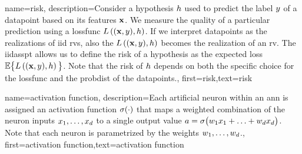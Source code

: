 {name={risk},
	description={Consider a \gls{hypothesis} $h$ used to predict the \gls{label} 
		$y$ of a \gls{datapoint} based on its \gls{feature}s ${\bf x}$. We measure 
		the quality of a particular \gls{prediction} using a \gls{lossfunc} $L\left(({\bf x},y),h \right)$. 
		If we interpret \gls{datapoint}s as the \gls{realization}s of \gls{iid} \gls{rv}s, 
		also the $L\left(({\bf x},y),h \right)$ becomes the \gls{realization} 
		of an \gls{rv}. The \gls{iidasspt} allows us to define the risk of a \gls{hypothesis} 
		as the expected \gls{loss} $\mathbb{E} \big\{L\left(({\bf x},y),h \right) \big\}$. 
		Note that the risk of $h$ depends on both the specific choice for the \gls{lossfunc} and the 
		\gls{probdist} of the \gls{datapoint}s.},
	first={risk},text={risk} 
}

{name={activation function},
	description={Each artificial neuron within an \gls{ann} is 
		assigned an activation function $\sigma(\cdot)$ that maps a weighted combination of 
		the neuron inputs $x_{1},\ldots,x_{d}$ to a single output 
		value $a = \sigma\big(w_{1} x_{1}+\ldots+w_{d} x_{d} \big)$. 
		Note that each neuron is parametrized by the \gls{weights} $w_{1},\ldots,w_{d}$.},
first={activation function},text={activation function} 
}

